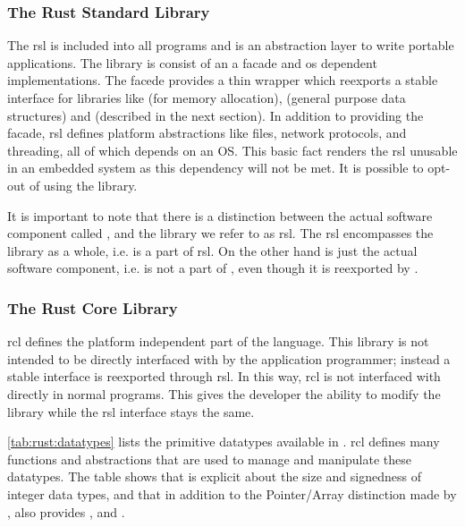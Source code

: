 \subsubsection{The Rust Standard Library}
\label{sec:rsl}

The \gls{rsl} is included into all {\rust} programs and is an abstraction layer to write portable applications.
The library is consist of an a facade and \gls{os} dependent implementations.
The facede provides a thin wrapper which reexports a stable interface for libraries like  (for memory allocation),  (general purpose data structures) and {\core} (described in the next section).
In addition to providing the facade, \gls{rsl} defines platform abstractions like files, network protocols, and threading, all of which depends on an OS.
This basic fact renders the \gls{rsl} unusable in an embedded system as this dependency will not be met.
It is possible to opt-out of using the library.

It is important to note that there is a distinction between the actual software component called {\std}, and the library we refer to as \gls{rsl}.
The \gls{rsl} encompasses the library as a whole, i.e.  is a part of \gls{rsl}.
On the other hand {\std} is just the actual software component, i.e.  is not a part of {\std}, even though it is reexported by {\std}.

\subsubsection{The Rust Core Library}
\label{sec:rcl}

\gls{rcl} defines the platform independent part of the language.
This library is not intended to be directly interfaced with by the application programmer; instead a stable interface is reexported through \gls{rsl}.
In this way, \gls{rcl} is not interfaced with directly in normal {\rust} programs.
This gives the developer the ability to modify the library while the \gls{rsl} interface stays the same.

\autoref{tab:rust:datatypes} lists the primitive datatypes available in {\rust}.
\gls{rcl} defines many functions and abstractions that are used to manage and manipulate these datatypes.
The table shows that {\rust} is explicit about the size and signedness of integer data types, and that in addition to the Pointer/Array distinction made by {\C}, {\rust} also provides ,  and .

